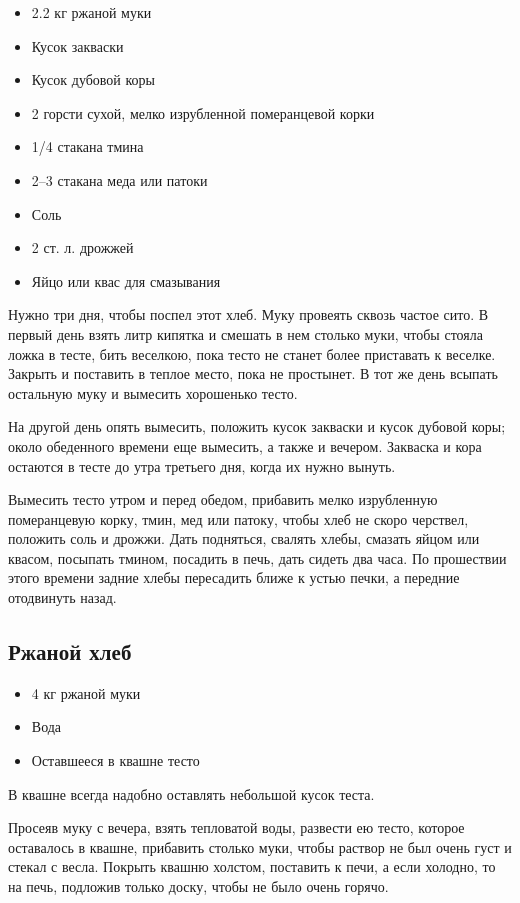 \begin{itemize}
	\item 2.2 кг ржаной муки 
    \item Кусок закваски 
    \item Кусок дубовой коры 
    \item 2 горсти сухой, мелко изрубленной померанцевой корки 
    \item 1/4 стакана тмина 
    \item 2–3 стакана меда или патоки 
    \item Соль 
    \item 2 ст. л. дрожжей 
    \item Яйцо или квас для смазывания
\end{itemize}

Нужно три дня, чтобы поспел этот хлеб. Муку провеять сквозь частое сито. В первый день взять литр кипятка и смешать в нем столько муки, чтобы стояла ложка в тесте, бить веселкою, пока тесто не станет более приставать к веселке. Закрыть и поставить в теплое место, пока не простынет. В тот же день всыпать остальную муку и вымесить хорошенько тесто.

На другой день опять вымесить, положить кусок закваски и кусок дубовой коры; около обеденного времени еще вымесить, а также и вечером. Закваска и кора остаются в тесте до утра третьего дня, когда их нужно вынуть.

Вымесить тесто утром и перед обедом, прибавить мелко изрубленную померанцевую корку, тмин, мед или патоку, чтобы хлеб не скоро черствел, положить соль и дрожжи. Дать подняться, свалять хлебы, смазать яйцом или квасом, посыпать тмином, посадить в печь, дать сидеть два часа. По прошествии этого времени задние хлебы пересадить ближе к устью печки, а передние отодвинуть назад.

\subsection{Ржаной хлеб}

\begin{itemize}
	\item 4 кг ржаной муки 
    \item Вода 
    \item Оставшееся в квашне тесто
\end{itemize}

В квашне всегда надобно оставлять небольшой кусок теста.

Просеяв муку с вечера, взять тепловатой воды, развести ею тесто, которое оставалось в квашне, прибавить столько муки, чтобы раствор не был очень густ и стекал с весла.
Покрыть квашню холстом, поставить к печи, а если холодно, то на печь, подложив только доску, чтобы не было очень горячо.

